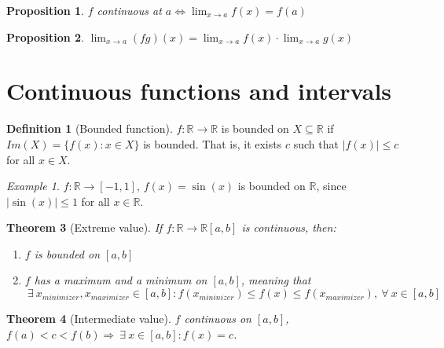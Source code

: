 \documentclass{article}
\newcommand{\DS}{\displaystyle}
\newcommand{\abs}[1]{\left|#1\right|}
\newcommand{\Ar}{\Rightarrow}
\newenvironment{enumrom}{\begin{enumerate}[label=(\roman*)]}{\end{enumerate}}
\newcommand{\f}[3]{#1 : #2 \rightarrow #3}
\newcommand{\fOnR}[1]{#1 : \mathbb{R} \rightarrow \mathbb{R}}
\newcommand{\intcc}[1]{\left[#1\right]}
\newcommand{\limx}[1]{\lim_{x \to #1}}
\theoremstyle{definition}
\newtheorem{definition}{Definition}[section]
\theoremstyle{definition}
\theoremstyle{plain}
\newtheorem{theorem}{Theorem}[section]
\theoremstyle{plain}
\theoremstyle{plain}
\theoremstyle{plain}
\newtheorem{proposition}[theorem]{Proposition}
\theoremstyle{definition}
\theoremstyle{remark}
\newtheorem{exampled}{Example}[definition]
\theoremstyle{remark}
\theoremstyle{remark}
\theoremstyle{remark}
\newcommand{\R}{\mathbb{R}}
\newcommand{\ForAll}{\ \forall \ }
\newcommand{\Exists}{\ \exists \ }
\begin{document}
\begin{proposition}
  $f$ continuous at $\DS a \iff \limx{a} f(x) = f(a)$
\end{proposition}


\begin{proposition}
  $\DS \limx{a} (fg)(x) = \limx{a} f(x) \cdot \limx{a} g(x)$
\end{proposition}


\section{Continuous functions and intervals}


\begin{definition}[Bounded function]
  $\fOnR{f}$ is bounded on $X \subseteq \R$ if $Im(X) = \{ f(x) : x \in X \}$ is bounded. That is, it exists $c$ such that $\abs{f(x)} \leq c$ for all $x \in X$.
\end{definition}

\begin{exampled}
  $\f{f}{\R}{\intcc{-1,1}}$, $f(x) = \sin(x)$ is bounded on $\R$, since $\abs{\sin(x)} \leq 1$ for all $x \in \R$.
\end{exampled}


\begin{theorem}[Extreme value]
  If $\fOnR{f}{\intcc{a,b}}$ is continuous, then:
  \begin{enumrom}
    \item $f$ is bounded on $\intcc{a,b}$
    \item $f$ has a maximum and a minimum on $\intcc{a,b}$, meaning that
      \[
      \Exists x_{minimizer}, x_{maximizer} \in \intcc{a,b} :
      f(x_{mininizer}) \leq f(x) \leq f(x_{maximizer}), \ForAll x \in \intcc{a,b}
      \]
  \end{enumrom}
\end{theorem}



\begin{theorem}[Intermediate value]
  $f$ continuous on $\intcc{a,b}$, $f(a) < c < f(b) \Ar \Exists x \in \intcc{a,b} : f(x) = c$.
\end{theorem}
\end{document}
